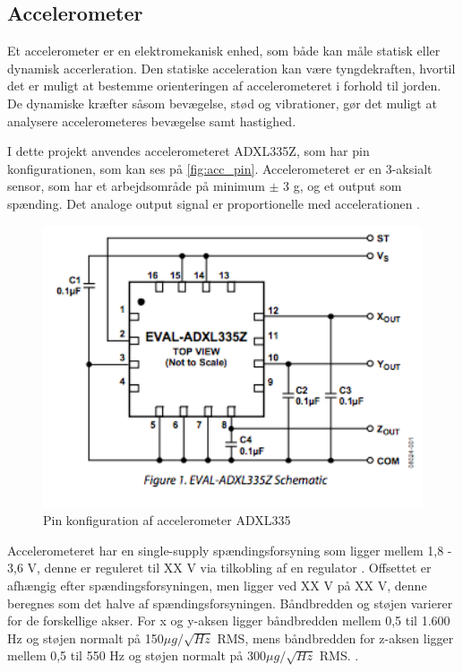 \subsection{Accelerometer}
Et accelerometer er en elektromekanisk enhed, som både kan måle statisk eller dynamisk accerleration. Den statiske acceleration kan være tyngdekraften, hvortil det er muligt at bestemme orienteringen af accelerometeret i forhold til jorden. De dynamiske kræfter såsom bevægelse, stød og vibrationer, gør det muligt at analysere accelerometeres bevægelse samt hastighed. 

I dette projekt anvendes accelerometeret ADXL335Z, som har pin konfigurationen, som kan ses på \autoref{fig:acc_pin}. Accelerometeret er en 3-aksialt sensor, som har et arbejdsområde på minimum $\pm$ 3 g, og et output som spænding. Det analoge output signal er proportionelle med accelerationen \citep{analogdevices2010}. 


\begin{figure}[H]
\centering
\includegraphics[width=1\textwidth]{figures/acc_pin.png}
\caption{Pin konfiguration af accelerometer ADXL335}
\label{fig:acc_pin}
\end{figure}

\noindent
Accelerometeret har en single-supply spændingsforsyning som ligger mellem 1,8 - 3,6 V, denne er reguleret til XX V via tilkobling af en regulator . Offsettet er afhængig efter spændingsforsyningen, men ligger ved XX V på  XX V, denne beregnes som det halve af spændingsforsyningen. Båndbredden og støjen varierer for de forskellige akser. For x og y-aksen ligger båndbredden mellem 0,5 til 1.600 Hz og støjen normalt på 150$\mu g/\sqrt{Hz}$ RMS, mens båndbredden for z-aksen ligger mellem 0,5 til 550 Hz og støjen normalt på $300\mu g/\sqrt{Hz}$ RMS.  . 


